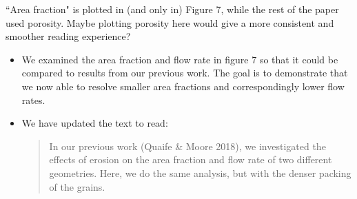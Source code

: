 \documentclass[11pt]{article}
\newcommand{\comment}[1]{{\color{blue} #1}}
\begin{document}
\noindent
\comment{``Area fraction" is plotted in (and only in) Figure 7, while
the rest of the paper used porosity. Maybe plotting porosity here would
give a more consistent and smoother reading experience?}
\begin{itemize}
  \item We examined the area fraction and flow rate in figure 7 so that
    it could be compared to results from our previous work. The goal is
    to demonstrate that we now able to resolve smaller area fractions
    and correspondingly lower flow rates.

  \item We have updated the text to read:
    \begin{quotation}
      \noindent
      In our previous work (Quaife \& Moore 2018), we investigated the
      effects of erosion on the area fraction and flow rate of two
      different geometries. Here, we do the same analysis, but with the
      denser packing of the grains.
    \end{quotation}

\end{itemize}
\end{document}
